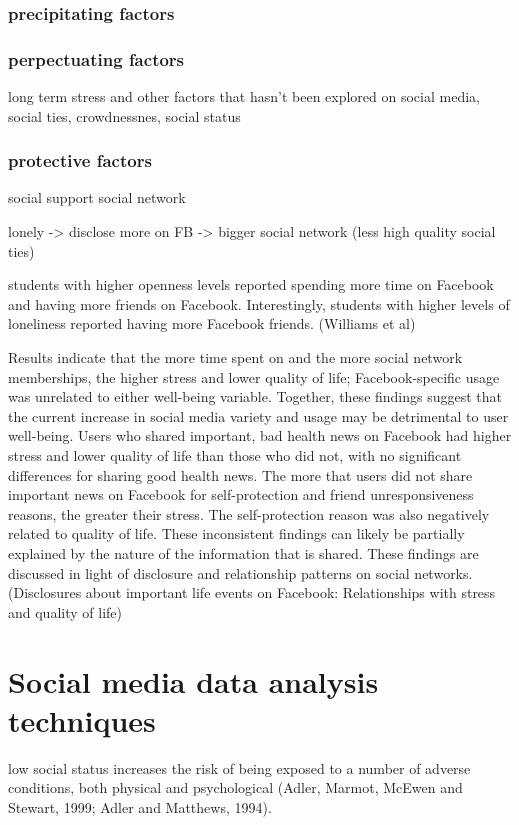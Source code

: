 \subsubsection{precipitating factors}


\subsubsection{perpectuating factors}

long term stress and other factors that hasn't been explored on social media, social ties, crowdnessnes, social status

\subsubsection{protective factors}

social support
social network

lonely  -> disclose more on FB -> bigger social network (less high quality social ties)

students with higher openness levels reported spending more time on Facebook and having more friends on Facebook. Interestingly, students with higher levels of loneliness reported having more Facebook friends. (Williams et al)


 Results indicate that the more time spent on and the more social network memberships, the higher stress and lower quality of life; Facebook-specific usage was unrelated to either well-being variable. Together, these findings suggest that the current increase in social media variety and usage may be detrimental to user well-being. Users who shared important, bad health news on Facebook had higher stress and lower quality of life than those who did not, with no significant differences for sharing good health news. The more that users did not share important news on Facebook for self-protection and friend unresponsiveness reasons, the greater their stress. The self-protection reason was also negatively related to quality of life. These inconsistent findings can likely be partially explained by the nature of the information that is shared. These findings are discussed in light of disclosure and relationship patterns on social networks. (Disclosures about important life events on Facebook: Relationships with stress and quality of life)



\section{Social media data analysis techniques}

low social status increases the risk of being exposed to a number of adverse conditions, both physical and psychological (Adler, Marmot, McEwen and Stewart, 1999; Adler and Matthews, 1994). 











